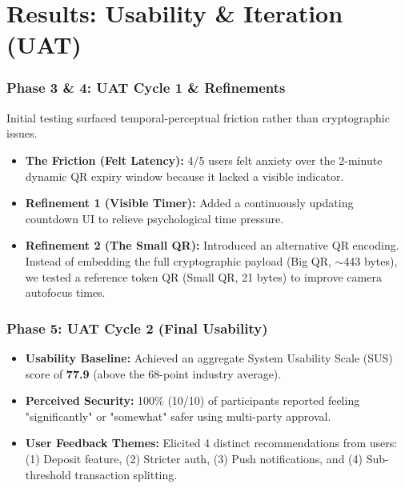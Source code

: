 \documentclass{beamer}
\begin{document}
\section{Results: Usability \& Iteration (UAT)}
\begin{frame}
  \frametitle{Phase 3 \& 4: UAT Cycle 1 \& Refinements}
  Initial testing surfaced temporal-perceptual friction rather than cryptographic issues.
  \vspace{0.3cm}
  \begin{itemize}
      \item \textbf{The Friction (Felt Latency):} 4/5 users felt anxiety over the 2-minute dynamic QR expiry window because it lacked a visible indicator.
      \item \textbf{Refinement 1 (Visible Timer):} Added a continuously updating countdown UI to relieve psychological time pressure.
      \item \textbf{Refinement 2 (The Small QR):} Introduced an alternative QR encoding. Instead of embedding the full cryptographic payload (Big QR, $\sim$443 bytes), we tested a reference token QR (Small QR, 21 bytes) to improve camera autofocus times.
  \end{itemize}
\end{frame}

\begin{frame}
  \frametitle{Phase 5: UAT Cycle 2 (Final Usability)}
  \begin{itemize}
      \item \textbf{Usability Baseline:} Achieved an aggregate System Usability Scale (SUS) score of \textbf{77.9} (above the 68-point industry average).
      \item \textbf{Perceived Security:} 100\% (10/10) of participants reported feeling "significantly" or "somewhat" safer using multi-party approval.
      \item \textbf{User Feedback Themes:} Elicited 4 distinct recommendations from users: (1) Deposit feature, (2) Stricter auth, (3) Push notifications, and (4) Sub-threshold transaction splitting.
  \end{itemize}
\end{frame}

\end{document}

